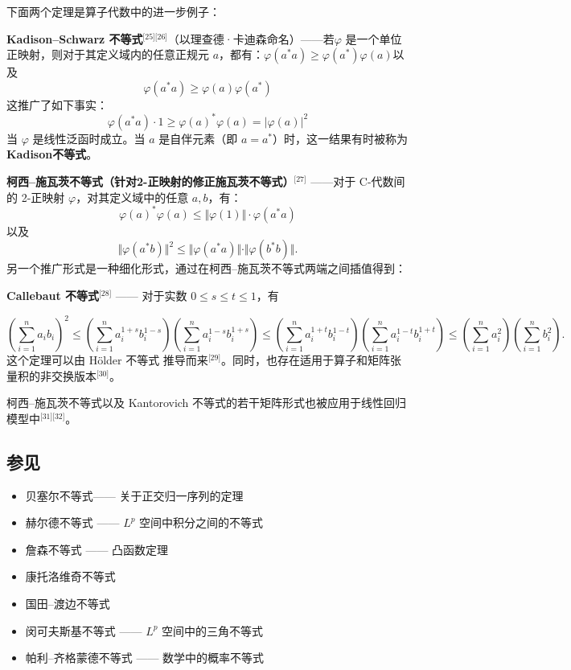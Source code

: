 下面两个定理是算子代数中的进一步例子：

\textbf{Kadison–Schwarz 不等式}\(^\text{[25][26]}\)（以理查德·卡迪森命名）——若$\varphi$ 是一个单位正映射，则对于其定义域内的任意正规元 $a$，都有：$\varphi (a^{*}a)\geq \varphi \left(a^{*}\right)\varphi (a)$以及
$$
\varphi \left(a^{*}a\right)\geq \varphi (a)\varphi \left(a^{*}\right)~
$$
这推广了如下事实：
$$
\varphi \left(a^{*}a\right)\cdot 1 \geq \varphi (a)^{*}\varphi (a) = |\varphi (a)|^{2}~
$$
当 $\varphi$ 是线性泛函时成立。当 $a$ 是自伴元素（即 $a = a^{*}$）时，这一结果有时被称为\textbf{Kadison不等式}。

\textbf{柯西–施瓦茨不等式（针对2-正映射的修正施瓦茨不等式）}\(^\text{[27]}\) ——对于 C\*-代数间的 2-正映射 $\varphi$，对其定义域中的任意 $a, b$，有：
$$
\varphi (a)^{*} \varphi (a) \leq \Vert \varphi (1) \Vert \cdot \varphi \left(a^{*}a\right)~
$$
以及
$$
\Vert \varphi \left(a^{*}b\right)\Vert ^{2} \leq \Vert \varphi \left(a^{*}a\right)\Vert \cdot \Vert \varphi \left(b^{*}b\right)\Vert.~
$$
另一个推广形式是一种细化形式，通过在柯西–施瓦茨不等式两端之间插值得到：

\textbf{Callebaut 不等式}\(^\text{[28]}\) —— 对于实数 $0 \leq s \leq t \leq 1$，有

$$
\left( \sum_{i=1}^{n} a_i b_i \right)^2 
\leq 
\left( \sum_{i=1}^{n} a_i^{1+s} b_i^{1-s} \right) \left( \sum_{i=1}^{n} a_i^{1-s} b_i^{1+s} \right)
\leq 
\left( \sum_{i=1}^{n} a_i^{1+t} b_i^{1-t} \right) \left( \sum_{i=1}^{n} a_i^{1-t} b_i^{1+t} \right)
\leq 
\left( \sum_{i=1}^{n} a_i^{2} \right) \left( \sum_{i=1}^{n} b_i^{2} \right).~
$$
这个定理可以由 Hölder 不等式 推导而来\(^\text{[29]}\)。同时，也存在适用于算子和矩阵张量积的非交换版本\(^\text{[30]}\)。

柯西–施瓦茨不等式以及 Kantorovich 不等式的若干矩阵形式也被应用于线性回归模型中\(^\text{[31][32]}\)。
\subsection{参见}
\begin{itemize}
\item 贝塞尔不等式—— 关于正交归一序列的定理
\item 赫尔德不等式 —— $L^p$ 空间中积分之间的不等式
\item 詹森不等式 —— 凸函数定理
\item 康托洛维奇不等式
\item 国田–渡边不等式
\item 闵可夫斯基不等式 —— $L^p$ 空间中的三角不等式
\item 帕利–齐格蒙德不等式 —— 数学中的概率不等式
\end{itemize}
